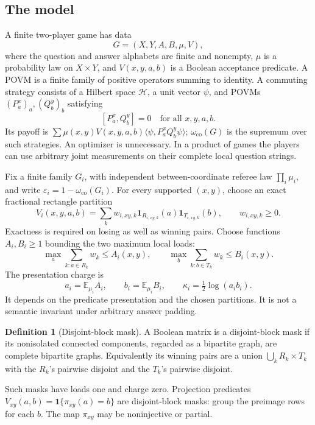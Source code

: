 \documentclass[11pt,reqno]{amsart}
\numberwithin{equation}{section}
\theoremstyle{definition}
\newtheorem{definition}[theorem]{Definition}
\theoremstyle{remark}
\newcommand{\E}{\mathbb E}
\newcommand{\one}{\mathbf1}
\newcommand{\eps}{\varepsilon}
\newcommand{\co}{\mathrm{co}}
\begin{document}
\subsection{The model}
A finite two-player game has data
\[
 G=(X,Y,A,B,\mu,V),
\]
where the question and answer alphabets are finite and nonempty, \(\mu\) is a probability law on \(X\times Y\), and \(V(x,y,a,b)\) is a Boolean acceptance predicate. A POVM is a finite family of positive operators summing to identity. A commuting strategy consists of a Hilbert space \(\mathcal H\), a unit vector \(\psi\), and POVMs \((P_a^x)_a,(Q_b^y)_b\) satisfying
\[
 [P_a^x,Q_b^y]=0
 \quad\text{for all }x,y,a,b.
\]
Its payoff is \(\sum\mu(x,y)V(x,y,a,b)\langle\psi,P_a^xQ_b^y\psi\rangle\); \(\omega_{\co}(G)\) is the supremum over such strategies. An optimizer is unnecessary. In a product of games the players can use arbitrary joint measurements on their complete local question strings.

Fix a finite family \(G_i\), with independent between-coordinate referee law \(\prod_i\mu_i\), and write \(\eps_i=1-\omega_{\co}(G_i)\). For every supported \((x,y)\), choose an exact fractional rectangle partition
\begin{equation}\label{eq:partition}
 V_i(x,y,a,b)=\sum_k w_{i,xy,k}
                  \one_{R_{i,xy,k}}(a)\one_{T_{i,xy,k}}(b),
 \qquad w_{i,xy,k}\ge0.
\end{equation}
Exactness is required on losing as well as winning pairs. Choose functions \(A_i,B_i\ge1\) bounding the two maximum local loads:
\[
 \max_a\sum_{k:a\in R_k}w_k\le A_i(x,y),
 \qquad
 \max_b\sum_{k:b\in T_k}w_k\le B_i(x,y).
\]
The presentation charge is
\begin{equation}\label{eq:kappa}
 a_i=\E_{\mu_i}A_i,\qquad b_i=\E_{\mu_i}B_i,\qquad
 \kappa_i=\tfrac12\log(a_ib_i).
\end{equation}
It depends on the predicate presentation and the chosen partitions. It is not a semantic invariant under arbitrary answer padding.

\begin{definition}[Disjoint-block mask]\label{def:block}
A Boolean matrix is a disjoint-block mask if its nonisolated connected components, regarded as a bipartite graph, are complete bipartite graphs. Equivalently its winning pairs are a union \( \bigcup_k R_k\times T_k\) with the \(R_k\)'s pairwise disjoint and the \(T_k\)'s pairwise disjoint.
\end{definition}
Such masks have loads one and charge zero. Projection predicates
\(V_{xy}(a,b)=\one\{\pi_{xy}(a)=b\}\) are disjoint-block masks: group the preimage rows for each \(b\). The map \(\pi_{xy}\) may be noninjective or partial.
\end{document}
